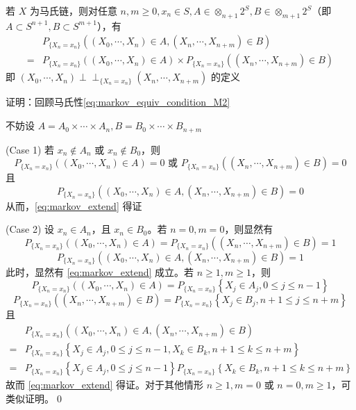 \begin{lemma}[马氏性的小推广]\label{lem:markov_extend}
若 \( X \) 为马氏链，则对任意 \( n,m \geq 0, x_n \in S, A \in \otimes_{n+1}2^S, B \in \otimes_{m+1}2^S \)（即 \( A \subset S^{n+1}, B \subset S^{m+1} \)），有
\begin{equation}
\begin{aligned}
&P_{\{X_n=x_n\}}((X_0, \cdots , X_n) \in A, (X_n, \cdots , X_{n+m}) \in B)\\
=&P_{\{X_n=x_n\}}((X_0, \cdots , X_n) \in A) \times P_{\{X_n=x_n\}}((X_n, \cdots , X_{n+m}) \in B)
\end{aligned}
\label{eq:markov_extend}
\end{equation}
即 \((X_0, \cdots , X_n) \perp \!\!\! \perp_{\{X_n=x_n\}} (X_n, \cdots , X_{n+m})\) 的定义
\end{lemma}

证明：回顾马氏性\eqref{eq:markov_equiv_condition_M2}

不妨设 \( A = A_0 \times \cdots \times A_n, B = B_0 \times \cdots \times B_{n+m} \)

(Case 1) 若 \( x_n \notin A_n \) 或 \( x_n \notin B_0 \)，则
\[
P_{\{X_n=x_n\}}((X_0, \cdots , X_n) \in A) = 0 \text{ 或 } P_{\{X_n=x_n\}}((X_n, \cdots , X_{n+m}) \in B) = 0
\]
且
\[
P_{\{X_n=x_n\}}((X_0, \cdots , X_n) \in A, (X_n, \cdots , X_{n+m}) \in B) = 0
\]
从而，\eqref{eq:markov_extend} 得证

(Case 2) 设 \( x_n \in A_n \)，且 \( x_n \in B_0 \)。若 \( n = 0, m = 0 \)，则显然有
\[
P_{\{X_n=x_n\}}((X_0, \cdots , X_n) \in A) = P_{\{X_n=x_n\}}((X_n, \cdots , X_{n+m}) \in B) = 1
\]
\[
P_{\{X_n=x_n\}}((X_0, \cdots , X_n) \in A, (X_n, \cdots , X_{n+m}) \in B) = 1
\]
此时，显然有 \eqref{eq:markov_extend} 成立。若 \( n \geq 1, m \geq 1 \)，则
\[
P_{\{X_n=x_n\}}((X_0, \cdots , X_n) \in A) = P_{\{X_n=x_n\}} \left\{ X_j \in A_j, 0 \leq j \leq n-1 \right\}
\]
\[
P_{\{X_n=x_n\}}((X_n, \cdots , X_{n+m}) \in B) = P_{\{X_n=x_n\}} \left\{ X_j \in B_j, n+1 \leq j \leq n+m \right\}
\]
且
\[
\begin{aligned}
&P_{\{X_n=x_n\}}((X_0, \cdots , X_n) \in A, (X_n, \cdots , X_{n+m}) \in B)\\ =& P_{\{X_n=x_n\}} \left\{ X_j \in A_j, 0 \leq j \leq n-1, X_k \in B_k, n+1 \leq k \leq n+m \right\}\\
=& P_{\{X_n=x_n\}} \left\{ X_j \in A_j, 0 \leq j \leq n-1 \right\} P_{\{X_n=x_n\}} \left\{ X_k \in B_k, n+1 \leq k \leq n+m \right\}
\end{aligned}
\]
故而 \eqref{eq:markov_extend} 得证。对于其他情形 \( n \geq 1, m = 0 \) 或 \( n = 0, m \geq 1 \)，可类似证明。\qed

